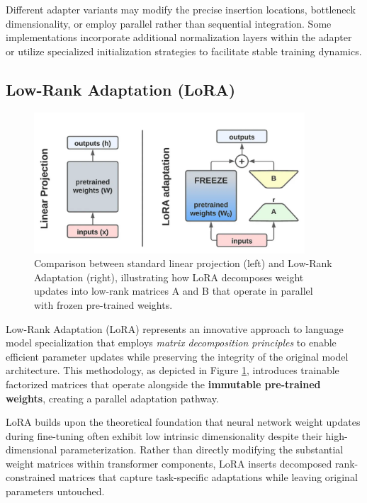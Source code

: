 \vspace{0.5cm}

Different adapter variants may modify the precise insertion locations, bottleneck dimensionality, or employ parallel rather than sequential integration. Some implementations incorporate additional normalization layers within the adapter or utilize specialized initialization strategies to facilitate stable training dynamics.

\subsection{Low-Rank Adaptation (LoRA)}
\begin{figure}[ht]
\centering
\includegraphics[width=0.9\textwidth]{img/chap05/5.2.3.png}
\caption{Comparison between standard linear projection (left) and Low-Rank Adaptation (right), illustrating how LoRA decomposes weight updates into low-rank matrices A and B that operate in parallel with frozen pre-trained weights.}
\label{fig:lora-adaptation}
\end{figure}

Low-Rank Adaptation (LoRA) represents an innovative approach to language model specialization that employs \textit{matrix decomposition principles} to enable efficient parameter updates while preserving the integrity of the original model architecture. This methodology, as depicted in Figure \ref{fig:lora-adaptation}, introduces trainable factorized matrices that operate alongside the \textbf{immutable pre-trained weights}, creating a parallel adaptation pathway.

LoRA builds upon the theoretical foundation that neural network weight updates during fine-tuning often exhibit low intrinsic dimensionality despite their high-dimensional parameterization. Rather than directly modifying the substantial weight matrices within transformer components, LoRA inserts decomposed rank-constrained matrices that capture task-specific adaptations while leaving original parameters untouched.

